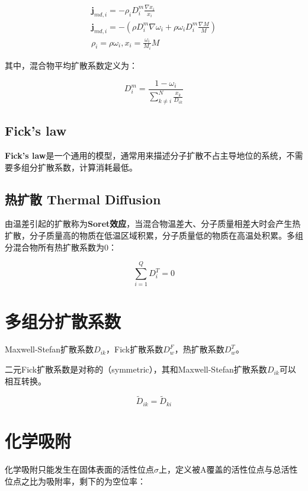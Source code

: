 \begin{gather}
    \bm{j}_{md,i} = -\rho_i D_i^m \frac{\nabla x_i}{x_i} \\
    \bm{j}_{md,i} = -\left( \rho D_i^m \nabla \omega_i + \rho \omega_i D_i^m \frac{\nabla M}{M} \right) \\
    \rho_i = \rho\omega_i, x_i = \frac{\omega_i}{M_i} M
\end{gather}

其中，混合物平均扩散系数定义为：

\begin{equation}
    D_i^m = \frac{1-\omega_i}{\sum_{k\neq i}^N \frac{x_k}{D_{ik}}}
\end{equation}

\subsection{Fick's law}
\textbf{Fick's law}是一个通用的模型，通常用来描述分子扩散不占主导地位的系统，不需要多组分扩散系数，计算消耗最低。

\subsection{热扩散 Thermal Diffusion}

由温差引起的扩散称为\textbf{Soret效应}，当混合物温差大、分子质量相差大时会产生热扩散，分子质量高的物质在低温区域积累，分子质量低的物质在高温处积累。多组分混合物所有热扩散系数为0：

\begin{equation}
    \sum_{i=1}^Q D_i^T = 0
\end{equation}

\section{多组分扩散系数}
Maxwell-Stefan扩散系数$ D_{ik} $，Fick扩散系数$ D_w^F $，热扩散系数$ D_w^T $。

二元Fick扩散系数是对称的（symmetric），其和Maxwell-Stefan扩散系数$D_{ik}$可以相互转换。

\begin{equation}
    \tilde{D}_{ik} = \tilde{D}_{ki}
\end{equation}

\section{化学吸附}
化学吸附只能发生在固体表面的活性位点$ \sigma $上，定义被A覆盖的活性位点与总活性位点之比为吸附率，剩下的为空位率：

